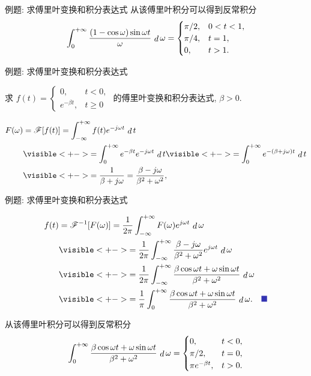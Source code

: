 \begin{frame}{例题: 求傅里叶变换和积分表达式}
从该傅里叶积分可以得到反常积分
\[\int_0^{+\infty}\frac{(1-\cos\omega)\sin{\omega t}}\omega\,\mathop{d}\omega=
	\begin{cases}
		\pi/2,&0<t<1,\\
		\pi/4,&t=1,\\
		0,&t>1.	
	\end{cases}\]
\end{frame}


\begin{frame}{例题: 求傅里叶变换和积分表达式}
\begin{example}
求 $f(t)=
	\begin{cases}
		0,&t<0,\\
		e^{-\beta t},&t\ge 0
	\end{cases}$ 的傅里叶变换和积分表达式, $\beta>0$.
\end{example}
\begin{solutions}
\vspace{-\baselineskip}
\begin{align*}
F(\omega)&=\msf[f(t)]=\int_{-\infty}^{+\infty}f(t)e^{-j\omega t}\diff t\\
&\visible<+->{=\int_0^{+\infty}e^{-\beta t}e^{-j\omega t}\diff t}
\visible<+->{=\int_0^{+\infty}e^{-(\beta+j\omega)t}\diff t}\\
&\visible<+->{=\frac1{\beta+j\omega}=\frac{\beta-j\omega}{\beta^2+\omega^2},}
\end{align*}
\end{solutions}
\end{frame}


\begin{frame}{例题: 求傅里叶变换和积分表达式}
\beqskip{0pt}
\begin{solutionc}
\vspace{-3pt}
\begin{align*}
f(t)&=\msf^{-1}[F(\omega)]=\frac1{2\pi}\int_{-\infty}^{+\infty}F(\omega)e^{j\omega t}\diff\omega\\
&\visible<+->{=\frac1{2\pi}\int_{-\infty}^{+\infty}\frac{\beta-j\omega}{\beta^2+\omega^2}e^{j\omega t}\diff\omega}\\
&\visible<+->{=\frac1{2\pi}\int_{-\infty}^{+\infty}\frac{\beta\cos{\omega t}+\omega\sin{\omega t}}{\beta^2+\omega^2}\diff\omega}\\
&\visible<+->{=\frac1\pi\int_0^{+\infty}\frac{\beta\cos{\omega t}+\omega\sin{\omega t}}{\beta^2+\omega^2}\diff\omega.\mqed}
\end{align*}
\end{solutionc}
\onslide<+->
从该傅里叶积分可以得到反常积分
\[\int_0^{+\infty}\frac{\beta\cos{\omega t}+\omega\sin{\omega t}}{\beta^2+\omega^2}\,\mathop{d}\omega=
	\begin{cases}
		0,&t<0,\\
		\pi/2,&t=0,\\
		\pi e^{-\beta t},&t>0.
	\end{cases}\]
\endgroup
\end{frame}


